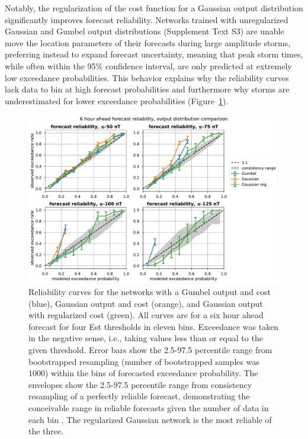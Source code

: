 Notably, the regularization of the cost function for a Gaussian output distribution significantly improves forecast reliability. Networks trained with unregularized Gaussian and Gumbel output distributions (Supplement Text S3) are unable move the location parameters of their forecasts during large amplitude storms, preferring instead to expand forecast uncertainty, meaning that peak storm times, while often within the 95\% confidence interval, are only predicted at extremely low exceedance probabilities. This behavior explains why the reliability curves lack data to bin at high forecast probabilities and furthermore why storms are underestimated for lower exceedance probabilities (Figure~\ref{fig:reliability}).

\begin{figure}[htbp]
  \centering
  \includegraphics[width=1.0\textwidth]{figures/est_forecast_reliability_distcompare_t+6.pdf} 
  \caption{Reliability curves for the networks with a Gumbel output and cost (blue), Gaussian output and cost (orange), and Gaussian output with regularized cost (green). All curves are for a six hour ahead forecast for four Est thresholds in eleven bins. Exceedance was taken in the negative sense, i.e., taking values less than or equal to the given threshold. Error bars show the 2.5-97.5 percentile range from bootstrapped resampling (number of bootstrapped samples was 1000) within the bins of forecasted exceedance probability. The envelopes show the 2.5-97.5 percentile range from consistency resampling of a perfectly reliable forecast, demonstrating the conceivable range in reliable forecasts given the number of data in each bin \citep{Brocker2007}. The regularized Gaussian network is the most reliable of the three.}
  \label{fig:reliability}
\end{figure}

